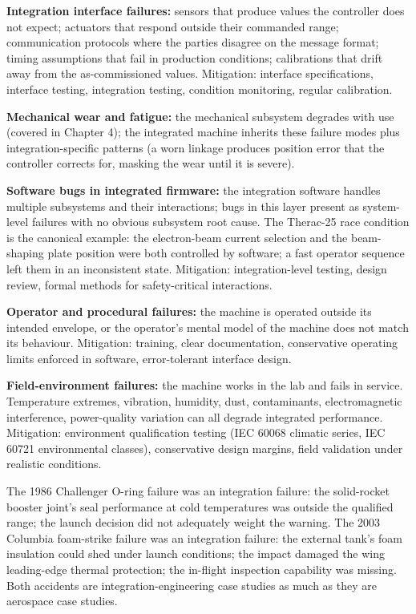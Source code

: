 \textbf{Integration interface failures:} sensors that produce values the controller does not expect; actuators that respond outside their commanded range; communication protocols where the parties disagree on the message format; timing assumptions that fail in production conditions; calibrations that drift away from the as-commissioned values. Mitigation: interface specifications, interface testing, integration testing, condition monitoring, regular calibration.

\textbf{Mechanical wear and fatigue:} the mechanical subsystem degrades with use (covered in Chapter 4); the integrated machine inherits these failure modes plus integration-specific patterns (a worn linkage produces position error that the controller corrects for, masking the wear until it is severe).

\textbf{Software bugs in integrated firmware:} the integration software handles multiple subsystems and their interactions; bugs in this layer present as system-level failures with no obvious subsystem root cause. The Therac-25 race condition is the canonical example: the electron-beam current selection and the beam-shaping plate position were both controlled by software; a fast operator sequence left them in an inconsistent state. Mitigation: integration-level testing, design review, formal methods for safety-critical interactions.

\textbf{Operator and procedural failures:} the machine is operated outside its intended envelope, or the operator's mental model of the machine does not match its behaviour. Mitigation: training, clear documentation, conservative operating limits enforced in software, error-tolerant interface design.

\textbf{Field-environment failures:} the machine works in the lab and fails in service. Temperature extremes, vibration, humidity, dust, contaminants, electromagnetic interference, power-quality variation can all degrade integrated performance. Mitigation: environment qualification testing (IEC 60068 climatic series, IEC 60721 environmental classes), conservative design margins, field validation under realistic conditions.

The 1986 Challenger O-ring failure was an integration failure: the solid-rocket booster joint's seal performance at cold temperatures was outside the qualified range; the launch decision did not adequately weight the warning. The 2003 Columbia foam-strike failure was an integration failure: the external tank's foam insulation could shed under launch conditions; the impact damaged the wing leading-edge thermal protection; the in-flight inspection capability was missing. Both accidents are integration-engineering case studies as much as they are aerospace case studies.

